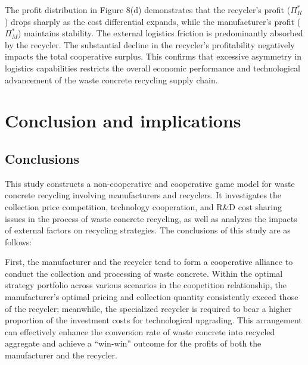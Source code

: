\documentclass[authoryear,preprint,review,times,10pt]{elsarticle}
\begin{document}
The profit distribution in Figure 8(d) demonstrates that the recycler's profit ($\Pi_R^*$) drops sharply as the cost differential expands, while the manufacturer's profit ($\Pi_M^*$) maintains stability. The external logistics friction is predominantly absorbed by the recycler. The substantial decline in the recycler's profitability negatively impacts the total cooperative surplus. This confirms that excessive asymmetry in logistics capabilities restricts the overall economic performance and technological advancement of the waste concrete recycling supply chain.

\section{Conclusion and implications}
\subsection{Conclusions}
This study constructs a non-cooperative and cooperative game model for waste concrete recycling involving manufacturers and recyclers. It investigates the collection price competition, technology cooperation, and R\&D cost sharing issues in the process of waste concrete recycling, as well as analyzes the impacts of external factors on recycling strategies. The conclusions of this study are as follows:

First, the manufacturer and the recycler tend to form a cooperative alliance to conduct the collection and processing of waste concrete. Within the optimal strategy portfolio across various scenarios in the coopetition relationship, the manufacturer's optimal pricing and collection quantity consistently exceed those of the recycler; meanwhile, the specialized recycler is required to bear a higher proportion of the investment costs for technological upgrading. This arrangement can effectively enhance the conversion rate of waste concrete into recycled aggregate and achieve a ``win-win'' outcome for the profits of both the manufacturer and the recycler.
\end{document}
